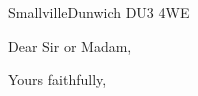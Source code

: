 \documentclass[11pt,english,signature,boldnames]{epistola}
\begin{document}
\address{21 Bridge Street}{Smallville}{Dunwich DU3 4WE}

\date{\today}


\opening{Dear Sir or Madam,}

\lipsum[1-2]

\closing{Yours faithfully,}
\end{document}
